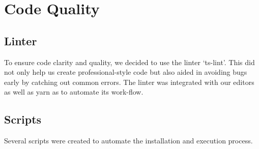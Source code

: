\section{Code Quality}
\subsection{Linter}
To ensure code clarity and quality, we decided to use the linter `ts-lint'. This did not only help us create professional-style code but also aided in avoiding bugs early by catching out common errors. The linter was integrated with our editors as well as yarn as to automate its work-flow.

\subsection{Scripts}
Several scripts were created to automate the installation and execution process. 